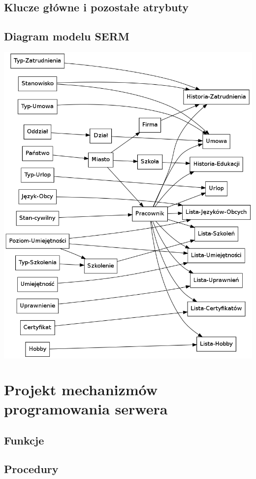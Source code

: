 \documentclass[a4paper]{article}
\begin{document}


\subsection{Klucze główne i pozostałe atrybuty}


\subsection{Diagram modelu SERM}
\includegraphics[width=\textwidth]{tex/srem.png}

\section{Projekt mechanizmów programowania serwera}
\subsection{Funkcje}

\subsection{Procedury}

\end{document}
